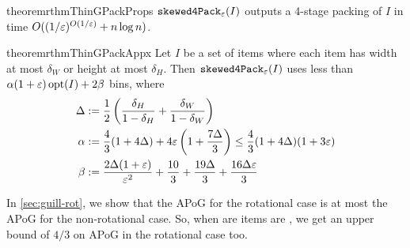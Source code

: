 \begin{restatable}{theorem}{rthmThinGPackProps}
\label{thm:thin-gpack-props}
$\operatorname{\mathtt{skewed4Pack}}_{\varepsilon}(I)$ outputs a 4-stage packing of $I$ in time
$O((1/\varepsilon)^{O(1/\varepsilon)} + n\log n)$.
\end{restatable}

\begin{restatable}{theorem}{rthmThinGPackAppx}
\label{thm:thin-gpack-appx}
Let $I$ be a set of items where each item has width at most $\delta_W$
or height at most $\delta_H$. Then $\operatorname{\mathtt{skewed4Pack}}_{\varepsilon}(I)$ uses less than
$\alpha(1+\varepsilon)\operatorname{opt}(I) + 2\beta$ bins, where
\begin{align*}
\Delta &:= \frac{1}{2}\left(\frac{\delta_H}{1-\delta_H}
    + \frac{\delta_W}{1-\delta_W}\right)
\\ \alpha &:= \frac{4}{3}(1+4\Delta) + 4\varepsilon\left(1 + \frac{7\Delta}{3}\right)
    \le \frac{4}{3}(1+4\Delta)(1+3\varepsilon)
\\ \beta &:= \frac{2\Delta(1+\varepsilon)}{\varepsilon^2} + \frac{10}{3}
    + \frac{19\Delta}{3} + \frac{16\Delta\varepsilon}{3}
\end{align*}
\end{restatable}

In \cref{sec:guill-rot}, we show that the APoG for the rotational case
is at most the APoG for the non-rotational case.
So, when are items are \thin{}, we get an upper bound of $4/3$ on APoG
in the rotational case too.
